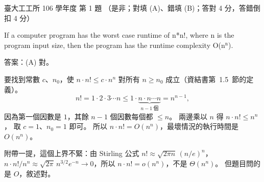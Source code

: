 \begin{pastexam}[label={px:ntu-106-ie-ds-01}]{臺大工工所 106 學年度 第 1 題}
（是非；對填 (A)、錯填 (B)；答對 4 分，答錯倒扣 4 分）

If a computer program has the worst case runtime of n*n!, where n is the program input size, then the
program has the runtime complexity O(n$^{\mathrm{n}}$).
\end{pastexam}

\begin{pastsoln}
答案：(A) 對。

要找到常數 $c$、$n_0$，使 $n \cdot n! \le c \cdot n^n$ 對所有 $n \ge n_0$ 成立（資結書第~1.5~節的定義）。
\[
n! = 1 \cdot 2 \cdot 3 \cdots n \le 1 \cdot \underbrace{n \cdot n \cdots n}_{n-1\ \text{個}} = n^{n-1},
\]
因為第一個因數是 $1$，其餘 $n - 1$ 個因數每個都 $\le n$。 兩邊乘以 $n$ 得 $n \cdot n! \le n^n$，
取 $c = 1$、$n_0 = 1$ 即可。 所以 $n \cdot n! = O(n^n)$，最壞情況的執行時間是 $O(n^n)$。

附帶一提，這個上界不緊：由 Stirling 公式 $n! \approx \sqrt{2\pi n}\,(n/e)^n$，
$n \cdot n! / n^n \approx \sqrt{2\pi}\, n^{3/2} e^{-n} \to 0$，所以 $n \cdot n! = o(n^n)$，不是 $\Theta(n^n)$。
但題目問的是 $O$，敘述對。
\end{pastsoln}
